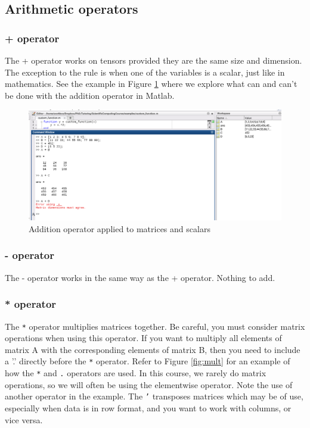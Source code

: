 \documentclass[12pt]{article}
\begin{document}
\subsection{Arithmetic operators}
\subsubsection{+ operator}
The + operator works on tensors provided they are the same size and dimension. The exception to the rule is when one of the variables is a scalar, just like in mathematics. See the example in Figure \ref{fig:add} where we explore what can and can't be done with the addition operator in Matlab. 
\begin{figure}[ht]
\centering
\includegraphics[scale=0.8]{add_operator.png}
\caption{Addition operator applied to matrices and scalars}
\label{fig:add}
\end{figure}


\subsubsection{- operator}
The - operator works in the same way as the + operator. Nothing to add. 

\subsubsection{* operator}
The \texttt{*} operator multiplies matrices together. Be careful, you must consider matrix operations when using this operator. If you want to multiply all elements of matrix A with the corresponding elements of matrix B, then you need to include a '.' directly before the \texttt{*} operator. Refer to Figure \ref{fig:mult} for an example of how the \texttt{*} and \texttt{.} operators are used. In this course, we rarely do matrix operations, so we will often be using the elementwise operator. Note the use of another operator in the example. The \texttt{'} transposes matrices which may be of use, especially when data is in row format, and you want to work with columns, or vice versa. 
\end{document}
